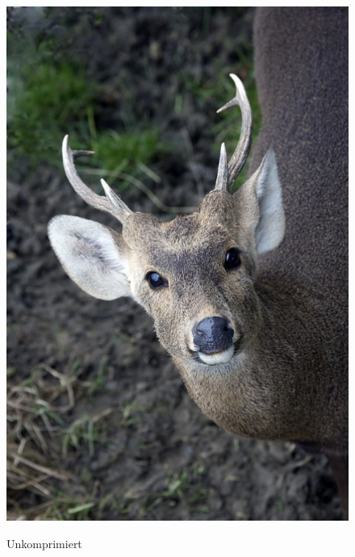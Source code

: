         \begin{multicols}{2}
            \begin{figure}[H]
                \begin{center}
                    \includegraphics[scale=1.5]{../pictures/gazelle-uncompressed.jpg}\\
                    \caption{Unkomprimiert}\label{fig:gazelle-uncompressed}
                \end{center}
            \end{figure}
            \par
            \begin{figure}[H]
                \begin{center}

\end{center}
\end{figure}
\end{multicols}
